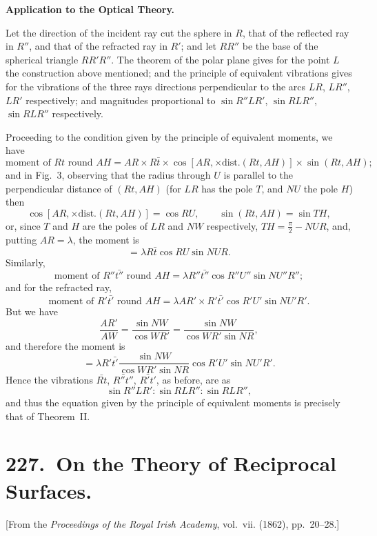 \documentclass[11pt,a4paper]{book}
\begin{document}
\bigskip

\textbf{Application to the Optical Theory.}

Let the direction of the incident ray cut the sphere in $R$, that of the reflected ray in $R''$, and that of the refracted ray in $R'$; and let $RR''$ be the base of the spherical triangle $RR'R''$. The theorem of the polar plane gives for the point $L$ the construction above mentioned; and the principle of equivalent vibrations gives for the vibrations of the three rays directions perpendicular to the arcs $LR$, $LR''$, $LR'$ respectively; and magnitudes proportional to $\sin R''LR'$, $\sin RLR''$, $\sin RLR''$ respectively.

Proceeding to the condition given by the principle of equivalent moments, we have
\[
\text{moment of }Rt\text{ round }AH=AR\times R\bar{t}\times\cos[AR,\times\text{dist.}(Rt,AH)]\times\sin(Rt,AH);
\]
and in Fig.~3, observing that the radius through $U$ is parallel to the perpendicular distance of $(Rt,AH)$ (for $LR$ has the pole $T$, and $NU$ the pole $H$) then
\[
\cos[AR,\times\text{dist.}(Rt,AH)]=\cos RU,\qquad \sin(Rt,AH)=\sin TH,
\]
or, since $T$ and $H$ are the poles of $LR$ and $NW$ respectively, $TH=\frac{\pi}{2}-NUR$, and, putting $AR=\lambda$, the moment is
\[
=\lambda R\bar{t}\cos RU\sin NUR.
\]
Similarly,
\[
\text{moment of }R''\bar{t''}\text{ round }AH=\lambda R''\bar{t''}\cos R''U''\sin NU''R'';
\]
and for the refracted ray,
\[
\text{moment of }R'\bar{t'}\text{ round }AH=\lambda AR'\times R'\bar{t'}\cos R'U'\sin NU'R'.
\]
But we have
\[
\frac{AR'}{AW}=\frac{\sin NW}{\cos WR'}=\frac{\sin NW}{\cos WR'\sin NR},
\]
and therefore the moment is
\[
=\lambda R'\bar{t'}\frac{\sin NW}{\cos WR'\sin NR}\cos R'U'\sin NU'R'.
\]
Hence the vibrations $\bar{Rt}$, $\bar{R''t''}$, $\bar{R't'}$, as before, are as
\[
\sin R''LR':\sin RLR'':\sin RLR'',
\]
and thus the equation given by the principle of equivalent moments is precisely that of Theorem~II.
\newpage

\chapter[On the Theory of Reciprocal Surfaces]{227.\ On the Theory of Reciprocal Surfaces.}
\label{paper227}

\begin{center}
\small
[From the \textit{Proceedings of the Royal Irish Academy}, vol.~vii. (1862), pp.~20--28.]
\end{center}
\end{document}

